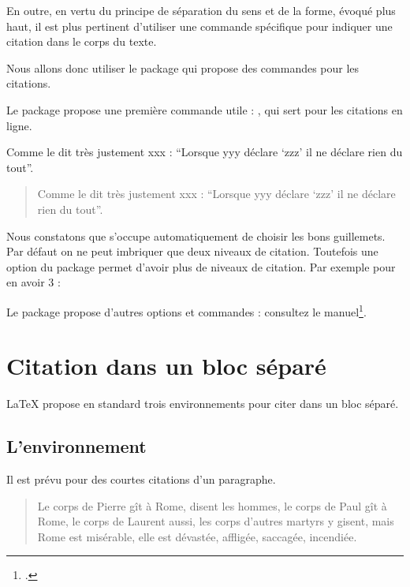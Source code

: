 En outre, en vertu du principe de séparation du sens et de la forme, évoqué plus haut, il est plus pertinent d'utiliser une commande spécifique pour indiquer une citation dans le corps du texte.

Nous allons donc utiliser le package  qui propose des commandes  pour les citations.



Le package propose une première commande utile : , qui sert pour les citations en ligne.

\begin{latexcode}
Comme le dit très justement xxx : \enquote{Lorsque yyy déclare \enquote{zzz} il ne déclare rien du tout}.
\end{latexcode}


\begin{quotation}
Comme le dit très justement xxx : \enquote{Lorsque yyy déclare \enquote{zzz} il ne déclare rien du tout}.
\end{quotation}


Nous constatons que  s'occupe automatiquement de choisir les bons guillemets. Par défaut on ne peut imbriquer que deux niveaux de citation. Toutefois une option du package permet d'avoir plus de niveaux de citation. Par exemple pour en avoir 3 : 

\begin{latexcode}
\usepackage[maxlevel=3]{csquotes}
\end{latexcode}

Le package propose d'autres options et commandes : consultez le manuel\footcite{csquotes}.

\section{Citation dans un bloc séparé}


LaTeX propose en standard trois environnements pour citer dans un bloc séparé.

\subsection{L'environnement }

Il est prévu pour des courtes citations d'un paragraphe.

\begin{latexcode}
\begin{quote}
Le corps de Pierre gît à Rome, disent les hommes,
le corps de Paul gît à Rome, le corps de Laurent aussi,
les corps d'autres martyrs y gisent,
mais Rome est misérable,
elle est dévastée, affligée, saccagée, incendiée.
\end{quote}
\end{latexcode}


